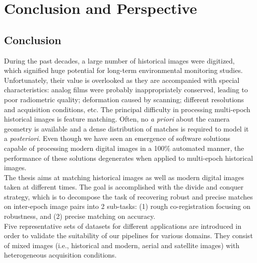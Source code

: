 
\chapter{Conclusion and Perspective}
\label{chap:conclusion}
\minitoc

\section{Conclusion}
During the past decades, a large number of historical images were digitized, which signified huge potential for long-term environmental monitoring studies. Unfortunately, their value is overlooked as they are accompanied with special characteristics: analog films were probably inappropriately conserved, leading to poor radiometric quality; deformation caused by scanning; different resolutions and acquisition conditions, etc. The principal difficulty in processing multi-epoch historical images is feature matching. Often, no \textit{a priori} about the camera geometry is available and a dense distribution of matches is required to model it a \textit{posteriori}. Even though we have seen an emergence of software solutions capable of processing modern digital images in a 100\% automated manner, the performance of these solutions degenerates when applied to multi-epoch historical images.\\

The thesis aims at matching historical images as well as modern digital images taken at different times. The goal is accomplished with the divide and conquer strategy, which is to decompose the task of recovering robust and precise matches on inter-epoch image pairs into 2 sub-tasks: (1) rough co-registration focusing on robustness, and (2) precise matching on accuracy.\\

Five representative sets of datasets for different applications are introduced in order to validate the suitability of our pipelines for various domains. They consist of mixed images (i.e., historical and modern, aerial and satellite images) with heterogeneous acquisition conditions.\\%

